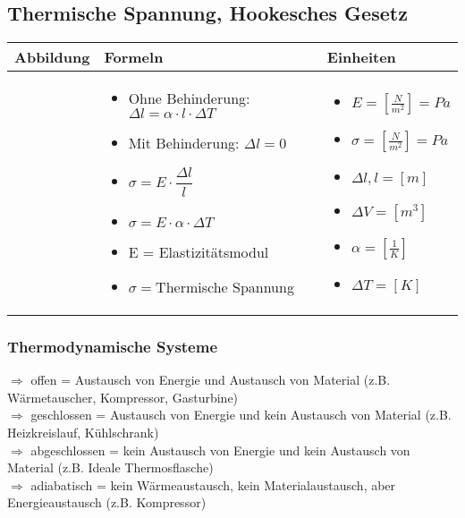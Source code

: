 \subsection{Thermische Spannung, Hookesches Gesetz}				%
	\begin{tabular}{ | m{6cm} | m{8cm} | m{4cm} | }
		\hline
		Abbildung & Formeln & Einheiten \\ \hline
		\hline
		\begin{minipage}{.3\textwidth}
			\tabImg[width=6.0cm]{images/Spannung}
		\end{minipage}
		&
		\begin{itemize}
			\item Ohne Behinderung: $\Delta l=\alpha\cdot l\cdot \Delta T$	
			\item Mit Behinderung: $\Delta l=0$	
			\item $\sigma=E\cdot \dfrac{\Delta l}{l}$
			\item $\sigma=E\cdot \alpha\cdot \Delta T$
			\item E = Elastizitätsmodul
			\item $\sigma=$Thermische Spannung
		\end{itemize}
		& 
		\begin{itemize}
			\item $E= [\frac{N}{m^{2}}]=Pa$
			\item $\sigma=[\frac{N}{m^{2}}]=Pa$
			\item $\Delta l,l= [m]$
			\item $\Delta V=[m^3]$
			\item $\alpha=[\frac{1}{K}]$	
			\item $\Delta T=[K]$
		\end{itemize}
		\\ \hline
	\end{tabular}
\subsubsection{Thermodynamische Systeme}
	$\Rightarrow$ offen = Austausch von Energie und Austausch von Material (z.B. Wärmetauscher, Kompressor, Gasturbine)\\
	$\Rightarrow$ geschlossen = Austausch von Energie und kein Austausch von Material (z.B. Heizkreislauf, Kühlschrank)\\
	$\Rightarrow$ abgeschlossen = kein Austausch von Energie und kein Austausch von Material (z.B. Ideale Thermosflasche)\\ 	
	$\Rightarrow$ adiabatisch = kein Wärmeaustausch, kein Materialaustausch, aber Energieaustausch (z.B. Kompressor)\\

